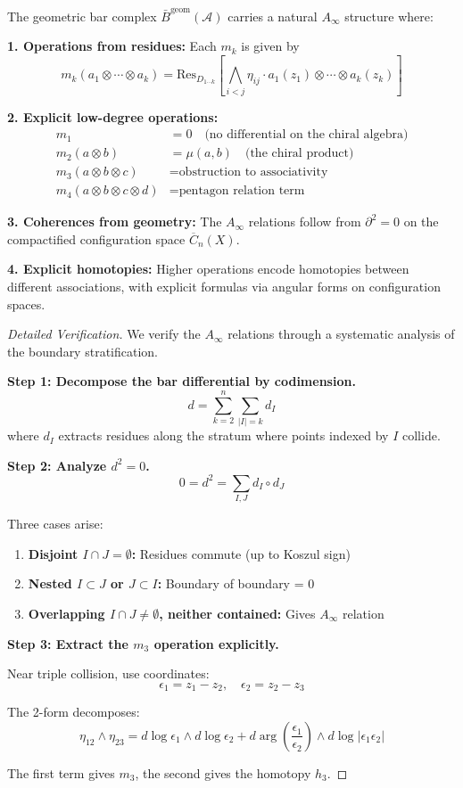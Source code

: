 \begin{theorem}\label{thm:bar-ainfty-complete}
The geometric bar complex $\bar{B}^{\text{geom}}(\mathcal{A})$ carries a natural $A_\infty$ structure where:

\textbf{1. Operations from residues:} Each $m_k$ is given by
$$m_k(a_1 \otimes \cdots \otimes a_k) = \text{Res}_{D_{1\cdots k}}\left[\bigwedge_{i<j} \eta_{ij} \cdot a_1(z_1) \otimes \cdots \otimes a_k(z_k)\right]$$

\textbf{2. Explicit low-degree operations:}
\begin{align}
m_1 &= 0 \quad \text{(no differential on the chiral algebra)} \\
m_2(a \otimes b) &= \mu(a,b) \quad \text{(the chiral product)} \\
m_3(a \otimes b \otimes c) &= \text{obstruction to associativity} \\
m_4(a \otimes b \otimes c \otimes d) &= \text{pentagon relation term}
\end{align}

\textbf{3. Coherences from geometry:} The $A_\infty$ relations follow from $\partial^2 = 0$ on the compactified configuration space $\overline{C}_n(X)$.

\textbf{4. Explicit homotopies:} Higher operations encode homotopies between different associations, with explicit formulas via angular forms on configuration spaces.
\end{theorem}

\begin{proof}[Detailed Verification]
We verify the $A_\infty$ relations through a systematic analysis of the boundary stratification.

\textbf{Step 1: Decompose the bar differential by codimension.}
$$d = \sum_{k=2}^n \sum_{|I|=k} d_I$$
where $d_I$ extracts residues along the stratum where points indexed by $I$ collide.

\textbf{Step 2: Analyze $d^2 = 0$.}
$$0 = d^2 = \sum_{I,J} d_I \circ d_J$$

Three cases arise:
\begin{enumerate}
\item \textbf{Disjoint $I \cap J = \emptyset$:} Residues commute (up to Koszul sign)
\item \textbf{Nested $I \subset J$ or $J \subset I$:} Boundary of boundary = 0
\item \textbf{Overlapping $I \cap J \neq \emptyset$, neither contained:} Gives $A_\infty$ relation
\end{enumerate}

\textbf{Step 3: Extract the $m_3$ operation explicitly.}

Near triple collision, use coordinates:
$$\epsilon_1 = z_1 - z_2, \quad \epsilon_2 = z_2 - z_3$$

The 2-form decomposes:
$$\eta_{12} \wedge \eta_{23} = d\log\epsilon_1 \wedge d\log\epsilon_2 + d\arg\left(\frac{\epsilon_1}{\epsilon_2}\right) \wedge d\log|\epsilon_1\epsilon_2|$$

The first term gives $m_3$, the second gives the homotopy $h_3$.
\end{proof}

